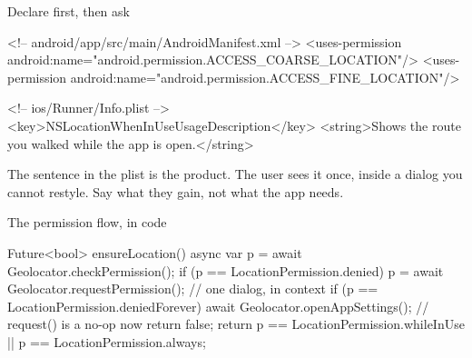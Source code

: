 \documentclass[10pt,aspectratio=169,t]{beamer}
\begin{document}
\begin{frame}[fragile,eyebrow=Location]{Declare first, then ask}
\begin{codeblock}[language=XML]
<!-- android/app/src/main/AndroidManifest.xml -->
<uses-permission android:name="android.permission.ACCESS_COARSE_LOCATION"/>
<uses-permission android:name="android.permission.ACCESS_FINE_LOCATION"/>

<!-- ios/Runner/Info.plist -->
<key>NSLocationWhenInUseUsageDescription</key>
<string>Shows the route you walked while the app is open.</string>
\end{codeblock}
  \vskip 1mm
  \begin{takeaway}{The sentence in the plist is the product.}
    The user sees it once, inside a dialog you cannot restyle. Say what they gain, not what the app needs.
  \end{takeaway}
\end{frame}

\begin{frame}[fragile,eyebrow=Location]{The permission flow, in code}
\begin{dart}
Future<bool> ensureLocation() async {
  var p = await Geolocator.checkPermission();
  if (p == LocationPermission.denied) {
    p = await Geolocator.requestPermission();   // one dialog, in context
  }
  if (p == LocationPermission.deniedForever) {
    await Geolocator.openAppSettings();         // request() is a no-op now
    return false;
  }
  return p == LocationPermission.whileInUse || p == LocationPermission.always;
}
\end{dart}
  \vskip 1mm
\end{frame}
\end{document}

